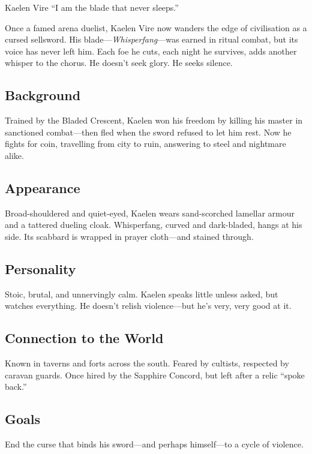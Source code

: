 \newpage
\begin{WyrdCharacterSheet}
    {Kaelen Vire}
    {“I am the blade that never sleeps.”}
    \label{pc:kaelen-vire}

    Once a famed arena duelist, Kaelen Vire now wanders the edge of civilisation as a cursed sellsword. His blade—\textit{Whisperfang}—was earned in ritual combat, but its voice has never left him. Each foe he cuts, each night he survives, adds another whisper to the chorus. He doesn't seek glory. He seeks silence.

    \subsection{Background}
    Trained by the Bladed Crescent, Kaelen won his freedom by killing his master in sanctioned combat—then fled when the sword refused to let him rest. Now he fights for coin, travelling from city to ruin, answering to steel and nightmare alike.

    \subsection{Appearance}
    Broad-shouldered and quiet-eyed, Kaelen wears sand-scorched lamellar armour and a tattered dueling cloak. Whisperfang, curved and dark-bladed, hangs at his side. Its scabbard is wrapped in prayer cloth—and stained through.

    \subsection{Personality}
    Stoic, brutal, and unnervingly calm. Kaelen speaks little unless asked, but watches everything. He doesn’t relish violence—but he’s very, very good at it.

    \subsection{Connection to the World}
    Known in taverns and forts across the south. Feared by cultists, respected by caravan guards. Once hired by the Sapphire Concord, but left after a relic “spoke back.”

    \subsection{Goals}
    End the curse that binds his sword—and perhaps himself—to a cycle of violence.


\end{WyrdCharacterSheet}
